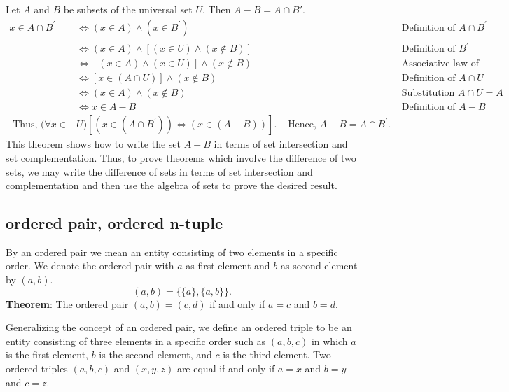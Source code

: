 \documentclass{article}
\begin{document}
    Let $A$ and $B$ be subsets of the universal set $U$. Then $A - B = A \cap B'$.
    $$
    \begin{aligned}
    x \in A \cap B^{\prime} & \Leftrightarrow(x \in A) \wedge\left(x \in B^{\prime}\right) & & \text { Definition of } A \cap B^{\prime} \\
    & \Leftrightarrow(x \in A) \wedge[(x \in U) \wedge(x \notin B)] & & \text { Definition of } B^{\prime} \\
    & \Leftrightarrow[(x \in A) \wedge(x \in U)] \wedge(x \notin B) & & \text { Associative law of conjunction } \\
    & \Leftrightarrow[x \in(A \cap U)] \wedge(x \notin B) & & \text { Definition of } A \cap U \\
    & \Leftrightarrow(x \in A) \wedge(x \notin B) & & \text { Substitution } A \cap U=A \\
    & \Leftrightarrow x \in A-B & & \text { Definition of } A-B \\
    \text { Thus, }(\forall x \in&U)\left[\left(x \in\left(A \cap B^{\prime}\right)\right) \Leftrightarrow(x \in(A-B))\right] . & \text { Hence, } A-B=A \cap B^{\prime}.
    \end{aligned}
    $$
    This theorem shows how to write the set $A - B$ in terms of set intersection and set complementation. Thus, to prove theorems which involve the difference of two sets, we may write the difference of sets in terms of set intersection and complementation and then use the algebra of sets to prove the desired result.

    \subsection{ordered pair, ordered n-tuple}

    By an ordered pair we mean an entity consisting of two elements in a specific order. We denote the ordered pair with $a$ as first element and $b$ as second element by $(a,b)$.
    $$
    (a,b) = \{\{a\},\{a,b\}\}.
    $$
    \textbf{Theorem}: The ordered pair $(a,b) = (c,d)$ if and only if $a = c$ and $b = d$.

    Generalizing the concept of an ordered pair, we define an ordered triple to be an entity consisting of three elements in a specific order such as $(a,b,c)$ in which $a$ is the first element, $b$ is the second element, and $c$ is the third element. Two ordered triples $(a,b,c)$ and $(x,y,z)$ are equal if and only if $a = x$ and $b = y$ and $c = z$.
\end{document}
